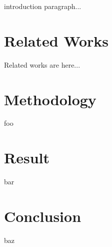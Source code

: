 \documentclass[conference]{IEEEtran}
\begin{document}
introduction paragraph...

\section{Related Works}\label{sec:related}

Related works are here...

\section{Methodology}

foo

\section{Result}

bar

\section{Conclusion}

baz

%
\scriptsize%

%
%
\end{document}
